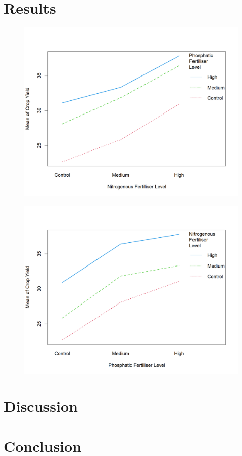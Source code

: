 \documentclass[12pt]{article}
\begin{document}
\section{Results}
\begin{tabular}    
\end{tabular}

\begin{figure}[h]
    \centering
    \includegraphics[width=0.8\linewidth]{Figures/Interaction Plot (Nitrogenous).png}
\end{figure}

\begin{figure}[h]
    \centering
    \includegraphics[width=0.8\linewidth]{Figures/Interaction Plot (Phosphatic).png}
\end{figure}


\section{Discussion}

\section{Conclusion}

\newpage

\printbibliography
\end{document}
